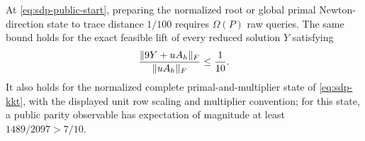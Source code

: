 \begin{theorem}
\label{thm:sdp-newton-state}
At \eqref{eq:sdp-public-start}, preparing the normalized root or global
primal Newton-direction state to trace distance $1/100$ requires $\Omega(P)$ raw
queries.  The same bound holds for the exact feasible lift of every reduced
solution $Y$ satisfying
\begin{equation}
 \frac{\lVert9Y+uA_h\rVert_F}{\lVert uA_h\rVert_F}\leq\frac1{10}.       \label{eq:sdp-reduced-residual}
\end{equation}
It also holds for the normalized complete primal-and-multiplier state of
\eqref{eq:sdp-kkt}, with the displayed unit row scaling and multiplier
convention; for this state, a public parity observable has expectation of
magnitude at least $1489/2097>7/10$.
\end{theorem}

